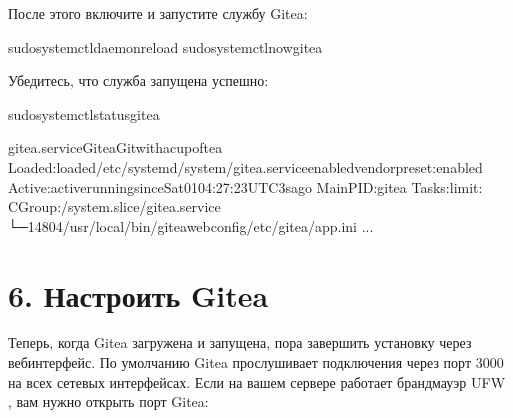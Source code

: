 \documentclass[a4paper,10pt,russian]{report}
\begin{document}
\sphinxAtStartPar
После этого включите и запустите службу Gitea:

\begin{sphinxVerbatim}[commandchars=\\\{\}]
\PYGZdl{}sudosystemctldaemon\PYGZhy{}reload
\PYGZdl{}sudosystemctl\PYGZhy{}\PYGZhy{}nowgitea
\end{sphinxVerbatim}

\sphinxAtStartPar
Убедитесь, что служба запущена успешно:

\begin{sphinxVerbatim}[commandchars=\\\{\}]
\PYGZdl{}sudosystemctlstatusgitea
\end{sphinxVerbatim}

\begin{sphinxVerbatim}[commandchars=\\\{\}]
gitea.service\PYGZhy{}GiteaGitwithacupoftea
Loaded:loaded/etc/systemd/system/gitea.serviceenabledvendorpreset:enabled
Active:activerunningsinceSat\PYGZhy{}01\PYGZhy{}04:27:23UTC3sago
MainPID:gitea
Tasks:limit:
CGroup:/system.slice/gitea.service
└─14804/usr/local/bin/giteaweb\PYGZhy{}\PYGZhy{}config/etc/gitea/app.ini
...
\end{sphinxVerbatim}


\section{6. Настроить Gitea}
\label{\detokenize{git:id5}}
\sphinxAtStartPar
Теперь, когда Gitea загружена и запущена, пора завершить установку через веб\sphinxhyphen{}интерфейс.
По умолчанию Gitea прослушивает подключения через порт 3000 на всех сетевых интерфейсах.
Если на вашем сервере работает брандмауэр UFW , вам нужно открыть порт Gitea:
\end{document}
